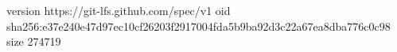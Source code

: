 version https://git-lfs.github.com/spec/v1
oid sha256:e37e240e47d97ec10cf26203f2917004fda5b9ba92d3c22a67ea8dba776c0c98
size 274719
